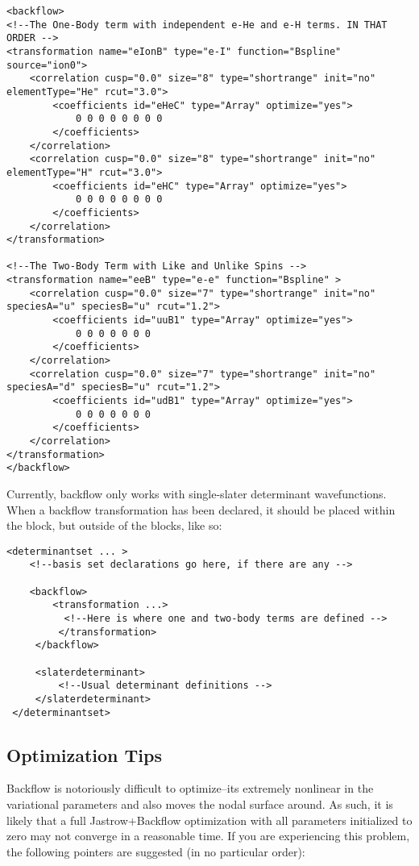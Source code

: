 \begin{lstlisting}[style=QMCPXML]
<backflow>
<!--The One-Body term with independent e-He and e-H terms. IN THAT ORDER -->
<transformation name="eIonB" type="e-I" function="Bspline" source="ion0">
    <correlation cusp="0.0" size="8" type="shortrange" init="no" elementType="He" rcut="3.0">
        <coefficients id="eHeC" type="Array" optimize="yes"> 
            0 0 0 0 0 0 0 0
        </coefficients>
    </correlation>
    <correlation cusp="0.0" size="8" type="shortrange" init="no" elementType="H" rcut="3.0">
        <coefficients id="eHC" type="Array" optimize="yes"> 
            0 0 0 0 0 0 0 0
        </coefficients>
    </correlation>
</transformation>

<!--The Two-Body Term with Like and Unlike Spins -->
<transformation name="eeB" type="e-e" function="Bspline" >
    <correlation cusp="0.0" size="7" type="shortrange" init="no" speciesA="u" speciesB="u" rcut="1.2">
        <coefficients id="uuB1" type="Array" optimize="yes"> 
            0 0 0 0 0 0 0
        </coefficients>
    </correlation>
    <correlation cusp="0.0" size="7" type="shortrange" init="no" speciesA="d" speciesB="u" rcut="1.2">
        <coefficients id="udB1" type="Array" optimize="yes"> 
            0 0 0 0 0 0 0
        </coefficients>
    </correlation>
</transformation>
</backflow>
\end{lstlisting}  

Currently, backflow only works with single-slater determinant wavefunctions.  When a backflow transformation has been declared, it should be placed within the  block, but outside of the  blocks, like so:

\begin{lstlisting}[style=QMCPXML]
<determinantset ... >
    <!--basis set declarations go here, if there are any -->
    
    <backflow>
        <transformation ...>
          <!--Here is where one and two-body terms are defined -->
         </transformation>
     </backflow>
     
     <slaterdeterminant>
         <!--Usual determinant definitions -->
     </slaterdeterminant>
 </determinantset>
\end{lstlisting}

\subsection{Optimization Tips}
Backflow is notoriously difficult to optimize--its extremely nonlinear in the variational parameters and also moves the nodal surface around.  As such, it is likely that a full Jastrow+Backflow optimization with all parameters initialized to zero may not converge in a reasonable time.  If you are experiencing this problem, the following pointers are suggested (in no particular order):

